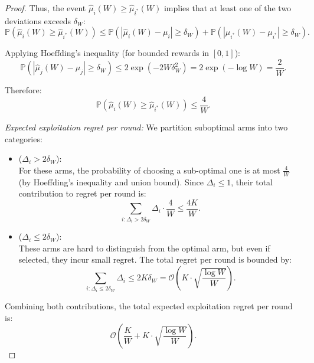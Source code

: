 \documentclass[review]{jair}
\begin{document}
\begin{proof}
Thus, the event $\hat{\mu}_i(W) \geq \hat{\mu}_{i^*}(W)$ implies that at least one of the two deviations exceeds $\delta_W$:
\begin{equation}
\mathbb{P}\left(\hat{\mu}_i(W) \geq \hat{\mu}_{i^*}(W)\right) \leq \mathbb{P}\left(|\hat{\mu}_i(W) - \mu_i| \geq \delta_W\right) + \mathbb{P}\left(|\hat{\mu}_{i^*}(W) - \mu_{i^*}| \geq \delta_W\right).
\end{equation}

Applying Hoeffding’s inequality (for bounded rewards in $[0,1]$):
\begin{equation}
\mathbb{P}\left(|\hat{\mu}_j(W) - \mu_j| \geq \delta_W\right) \leq 2 \exp(-2W \delta_W^2) = 2 \exp(-\log W) = \frac{2}{W}.
\end{equation}

Therefore:
\begin{equation}
\mathbb{P}\left(\hat{\mu}_i(W) \geq \hat{\mu}_{i^*}(W)\right) \leq \frac{4}{W}.
\end{equation}

\noindent \textit{Expected exploitation regret per round:} \newline
We partition suboptimal arms into two categories:

\begin{itemize}
    \item {} ($\Delta_i > 2\delta_W$):\\
    For these arms, the probability of choosing a sub-optimal one is at most $\frac{4}{W}$ (by Hoeffding's inequality and union bound). Since $\Delta_i \leq 1$, their total contribution to regret per round is:
    \begin{equation}
    \sum_{i : \Delta_i > 2\delta_W} \Delta_i \cdot \frac{4}{W} \leq \frac{4K}{W}.
    \end{equation}

    \item {} ($\Delta_i \leq 2\delta_W$):\\
    These arms are hard to distinguish from the optimal arm, but even if selected, they incur small regret. The total regret per round is bounded by:
    \begin{equation}
    \sum_{i : \Delta_i \leq 2\delta_W} \Delta_i \leq 2K \delta_W = \mathcal{O}\left( K \cdot \sqrt{\frac{\log W}{W}} \right).
    \end{equation}
\end{itemize}

Combining both contributions, the total expected exploitation regret per round is:
\begin{equation}
\mathcal{O}\left( \frac{K}{W} + K \cdot \sqrt{\frac{\log W}{W}} \right).
\end{equation}


\end{proof}
\end{document}
